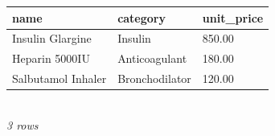 {\scriptsize\setlength{\tabcolsep}{2.5pt}\begin{tabular}{lll}\toprule
\textbf{name} & \textbf{category} & \textbf{unit\_price} \\\midrule
Insulin Glargine & Insulin & 850.00 \\
Heparin 5000IU & Anticoagulant & 180.00 \\
Salbutamol Inhaler & Bronchodilator & 120.00 \\
\bottomrule\end{tabular}}\\[-1pt]{\tiny\itshape 3 rows}
